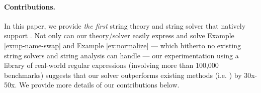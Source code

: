 {%
}



\paragraph*{Contributions.}
In this paper, we provide \emph{the first} string theory and string solver that
natively support \regexp{}. Not only can our theory/solver easily express and 
solve Example
\ref{exmp-name-swap} and Example \ref{ex:normalize} --- which hitherto no 
existing string solvers and string analysis can handle --- our experimentation
using a library of real-world regular expressions (involving more than 100,000
benchmarks) suggests that our solver outperforms existing methods (i.e.
\cite{aratha,LMK19}) by 30x-50x. We provide more details of our contributions
below.

